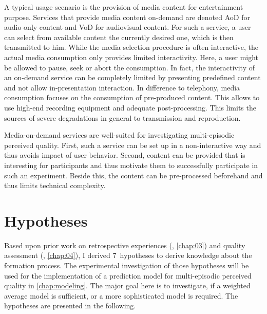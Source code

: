 A typical usage scenario is the provision of media content for entertainment purpose.
Services that provide media content on-demand are denoted \acf{AoD} for audio-only content and \acf{VoD} for audiovisual content.
For such a service, a user can select from available content the currently desired one, which is then transmitted to him.
While the media selection procedure is often interactive, the actual media consumption only provides limited interactivity.
Here, a user might be allowed to pause, seek or abort the consumption.
In fact, the interactivity of an on-demand service can be completely limited by presenting predefined content and not allow in-presentation interaction.
In difference to telephony, media consumption focuses on the consumption of pre-produced content.
This allows to use high-end recording equipment and adequate post-processing. %
This limits the sources of severe degradations in general to transmission and reproduction.

Media-on-demand services are well-suited for investigating multi-episodic perceived quality.
First, such a service can be set up in a non-interactive way and thus avoids impact of user behavior.
Second, content can be provided that is interesting for participants and thus motivate them to successfully participate in such an experiment.
Beside this, the content can be pre-processed beforehand and thus limits technical complexity.

\section{Hypotheses}
Based upon prior work on retrospective experiences (\cf, \autoref{chap:03}) and quality assessment (\cf, \autoref{chap:04}), I derived 7~hypotheses to derive knowledge about the formation process.
The experimental investigation of those hypotheses will be used for the implementation of a prediction model for multi-episodic perceived quality in \autoref{chap:modeling}.
The major goal here is to investigate, if a weighted average model is sufficient, or a more sophisticated model is required.
The hypotheses are presented in the following.

